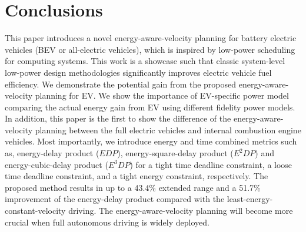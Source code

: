 \documentclass{IEEEtran}
\begin{document}
\section{Conclusions} \label{sec:conclusions}

This paper introduces a novel energy-aware-velocity planning for battery electric vehicles (BEV or all-electric vehicles), which is inspired by low-power scheduling for computing systems. This work is a showcase such that classic system-level  low-power design methodologies significantly improves electric vehicle fuel efficiency. We demonstrate the potential gain from the proposed energy-aware-velocity planning for EV. We show the importance of EV-specific power model  comparing the actual energy gain from EV using different fidelity power models. In addition, this paper is the first to show the difference of the energy-aware-velocity planning between the full electric vehicles and internal combustion engine vehicles. Most importantly, we introduce energy and time combined metrics such as, energy-delay product ($EDP$), energy-square-delay product ($E^2DP$) and energy-cubic-delay product ($E^3DP$) for a tight time deadline constraint, a loose time deadline constraint, and a tight energy constraint, respectively. 
The proposed method results in up to a 43.4\% extended range and a  51.7\% improvement of the energy-delay product compared with the least-energy-constant-velocity driving. 
The energy-aware-velocity planning will become more crucial when full autonomous driving is widely deployed.





\end{document}
